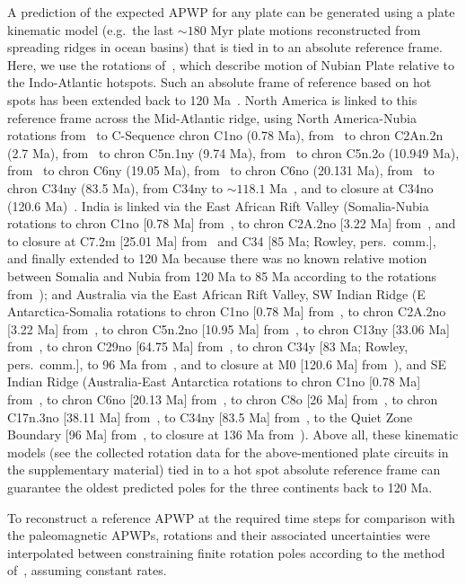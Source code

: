 A prediction of the expected APWP for any plate can be generated using a plate
kinematic model (e.g.\ the last ${\sim}180$ Myr plate motions
reconstructed from spreading ridges in ocean basins) that is tied in to an
absolute reference frame. Here, we use the rotations of~\citet{O05}, which
describe motion of Nubian Plate relative to the Indo-Atlantic hotspots.
Such an absolute frame of reference based on hot spots has been extended back to
120 Ma~\citep{O05}. North America is linked to this reference frame across the
Mid-Atlantic ridge, using North America-Nubia rotations from~\citet{D10} to
C-Sequence chron C1no (0.78 Ma), from~\citet{S12} to chron C2An.2n (2.7 Ma),
from~\citet{M99} to chron C5n.1ny (9.74 Ma), from~\citet{G13} to chron C5n.2o
(10.949 Ma), from~\citet{M99} to chron C6ny (19.05 Ma), from~\citet{G13} to
chron C6no (20.131 Ma), from~\citet{M99} to chron C34ny (83.5 Ma), from C34ny to
${\sim}118.1$ Ma~\citep{S12}, and to closure at C34no (120.6 Ma)~\citep{G13}.
India is linked via the East African Rift Valley (Somalia-Nubia rotations to
chron C1no [0.78 Ma] from~\citet{D17}, to chron C2A.2no [3.22 Ma] from~\citet{H05},
and to closure at C7.2m [25.01 Ma] from~\citet{R16} and C34 [85 Ma; Rowley, pers.\
comm.], and finally extended to 120 Ma because there was no known relative
motion between Somalia and Nubia from 120 Ma to 85 Ma according to the rotations
from~\citet{M16}); and Australia via the East African Rift Valley, SW Indian
Ridge (E Antarctica-Somalia rotations to chron C1no [0.78 Ma] from~\citet{D17},
to chron C2A.2no [3.22 Ma] from~\citet{H05}, to chron C5n.2no [10.95 Ma]
from~\citet{L02}, to chron C13ny [33.06 Ma] from~\citet{P08}, to chron C29no
[64.75 Ma] from~\citet{C10}, to chron C34y [83 Ma; Rowley, pers.\ comm.], to 96
Ma from~\citet{M01}, and to closure at M0 [120.6 Ma] from~\citet{M08}), and SE
Indian Ridge (Australia-East Antarctica rotations to chron C1no [0.78 Ma]
from~\citet{D17}, to chron C6no [20.13 Ma] from~\citet{C04}, to chron C8o [26 Ma]
from~\citet{G18}, to chron C17n.3no [38.11 Ma] from~\citet{C04}, to C34ny [83.5
Ma] from~\citet{Wh13}, to the Quiet Zone Boundary [96 Ma] from~\citet{W07}, to
closure at 136 Ma from~\citet{Wh13}). Above all, these kinematic models (see the
collected rotation data for the above-mentioned plate circuits in the
supplementary material) tied in to a hot spot absolute reference frame can
guarantee the oldest predicted poles for the three continents back to 120 Ma.

To reconstruct a reference APWP at the required time steps for comparison with
the paleomagnetic APWPs, rotations and their associated uncertainties were
interpolated between constraining finite rotation poles according to the method
of~\citet{D08}, assuming constant rates.

